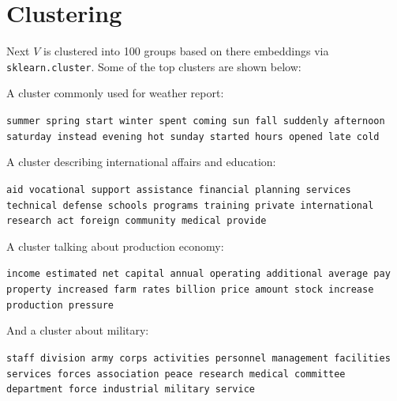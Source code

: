 \documentclass[12pt]{article}
\begin{document}
\section{Clustering}
Next $V$ is clustered into 100 groups based on there embeddings via \texttt{sklearn.cluster}. Some of the top clusters are shown below:

A cluster commonly used for weather report:

\texttt{summer spring start winter spent coming sun fall suddenly afternoon
saturday instead evening hot sunday started hours opened late cold}

A cluster describing international affairs and education:

\texttt{aid vocational support assistance financial planning services technical defense schools
programs training private international research act foreign community medical provide}

A cluster talking about production economy:

\texttt{income estimated net capital annual operating additional average pay property
increased farm rates billion price amount stock increase production pressure}

And a cluster about military:

\texttt{staff division army corps activities personnel management facilities services forces
association peace research medical committee department force industrial military service}

%
\end{document}
